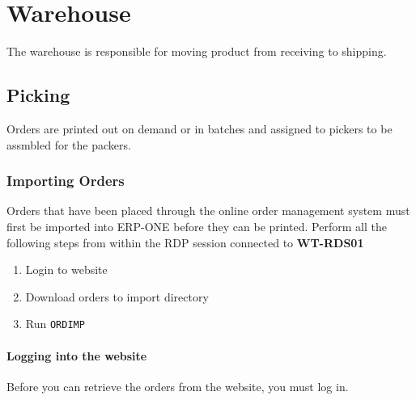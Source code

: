 \section{Warehouse}

The warehouse is responsible for moving product from receiving to shipping.

\subsection{Picking}

Orders are printed out on demand or in batches and assigned to pickers to be assmbled for the packers.

\subsubsection{Importing Orders}


Orders that have been placed through the online order management system must first be imported into ERP-ONE before they can be printed. Perform all the following steps from within the RDP session connected to \textbf{WT-RDS01}

\begin{enumerate}
	\item Login to website
	\item Download orders to import directory
	\item Run \texttt{ORDIMP}
\end{enumerate}

\paragraph{Logging into the website}

Before you can retrieve the orders from the website, you must log in.

